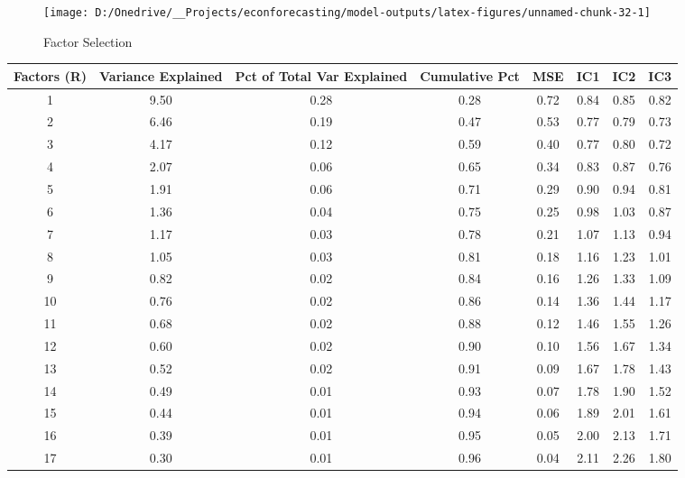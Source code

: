 \documentclass[11pt, letterpaper]{article}\usepackage[]{graphicx}\usepackage[]{color}
\begin{document}
\begin{figure}[H]

{\centering \texttt{[image: D:/Onedrive/\_\_Projects/econforecasting/model-outputs/latex-figures/unnamed-chunk-32-1]} 

}

\caption[Factor Selection]{Factor Selection}\label{fig:unnamed-chunk-32}
\end{figure}



\begin{table}[H]
\centering
\begingroup\scriptsize
\begin{tabular}{cccccccc}
  \hline
Factors (R) & Variance Explained & Pct of Total Var Explained & Cumulative Pct & MSE & IC1 & IC2 & IC3 \\ 
  \hline
  1 & 9.50 & 0.28 & 0.28 & 0.72 & 0.84 & 0.85 & 0.82 \\ 
    2 & 6.46 & 0.19 & 0.47 & 0.53 & 0.77 & 0.79 & 0.73 \\ 
    3 & 4.17 & 0.12 & 0.59 & 0.40 & 0.77 & 0.80 & 0.72 \\ 
    4 & 2.07 & 0.06 & 0.65 & 0.34 & 0.83 & 0.87 & 0.76 \\ 
    5 & 1.91 & 0.06 & 0.71 & 0.29 & 0.90 & 0.94 & 0.81 \\ 
    6 & 1.36 & 0.04 & 0.75 & 0.25 & 0.98 & 1.03 & 0.87 \\ 
    7 & 1.17 & 0.03 & 0.78 & 0.21 & 1.07 & 1.13 & 0.94 \\ 
    8 & 1.05 & 0.03 & 0.81 & 0.18 & 1.16 & 1.23 & 1.01 \\ 
    9 & 0.82 & 0.02 & 0.84 & 0.16 & 1.26 & 1.33 & 1.09 \\ 
   10 & 0.76 & 0.02 & 0.86 & 0.14 & 1.36 & 1.44 & 1.17 \\ 
   11 & 0.68 & 0.02 & 0.88 & 0.12 & 1.46 & 1.55 & 1.26 \\ 
   12 & 0.60 & 0.02 & 0.90 & 0.10 & 1.56 & 1.67 & 1.34 \\ 
   13 & 0.52 & 0.02 & 0.91 & 0.09 & 1.67 & 1.78 & 1.43 \\ 
   14 & 0.49 & 0.01 & 0.93 & 0.07 & 1.78 & 1.90 & 1.52 \\ 
   15 & 0.44 & 0.01 & 0.94 & 0.06 & 1.89 & 2.01 & 1.61 \\ 
   16 & 0.39 & 0.01 & 0.95 & 0.05 & 2.00 & 2.13 & 1.71 \\ 
   17 & 0.30 & 0.01 & 0.96 & 0.04 & 2.11 & 2.26 & 1.80 \\ 

\end{tabular}
\end{table}
\end{document}
